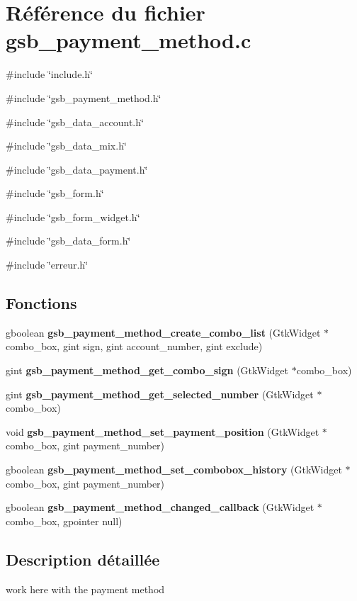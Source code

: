 \section{Référence du fichier gsb\_\-payment\_\-method.c}
\label{gsb__payment__method_8c}
{\ttfamily \#include \char`\"{}include.h\char`\"{}}\par
{\ttfamily \#include \char`\"{}gsb\_\-payment\_\-method.h\char`\"{}}\par
{\ttfamily \#include \char`\"{}gsb\_\-data\_\-account.h\char`\"{}}\par
{\ttfamily \#include \char`\"{}gsb\_\-data\_\-mix.h\char`\"{}}\par
{\ttfamily \#include \char`\"{}gsb\_\-data\_\-payment.h\char`\"{}}\par
{\ttfamily \#include \char`\"{}gsb\_\-form.h\char`\"{}}\par
{\ttfamily \#include \char`\"{}gsb\_\-form\_\-widget.h\char`\"{}}\par
{\ttfamily \#include \char`\"{}gsb\_\-data\_\-form.h\char`\"{}}\par
{\ttfamily \#include \char`\"{}erreur.h\char`\"{}}\par
\subsection*{Fonctions}
\begin{DoxyCompactItemize}
\item 
gboolean {\bf gsb\_\-payment\_\-method\_\-create\_\-combo\_\-list} (GtkWidget $\ast$combo\_\-box, gint sign, gint account\_\-number, gint exclude)
\item 
gint {\bf gsb\_\-payment\_\-method\_\-get\_\-combo\_\-sign} (GtkWidget $\ast$combo\_\-box)
\item 
gint {\bf gsb\_\-payment\_\-method\_\-get\_\-selected\_\-number} (GtkWidget $\ast$combo\_\-box)
\item 
void {\bf gsb\_\-payment\_\-method\_\-set\_\-payment\_\-position} (GtkWidget $\ast$combo\_\-box, gint payment\_\-number)
\item 
gboolean {\bf gsb\_\-payment\_\-method\_\-set\_\-combobox\_\-history} (GtkWidget $\ast$combo\_\-box, gint payment\_\-number)
\item 
gboolean {\bf gsb\_\-payment\_\-method\_\-changed\_\-callback} (GtkWidget $\ast$combo\_\-box, gpointer null)
\end{DoxyCompactItemize}


\subsection{Description détaillée}
work here with the payment method 

